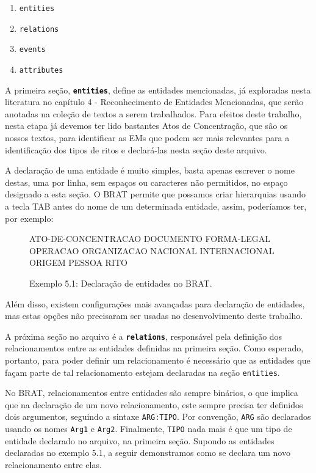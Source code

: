 \documentclass[11pt]{report}
\begin{document}
\begin{enumerate}[label={\textbf{\arabic*.}}]
  \item \texttt{entities}
  \item \texttt{relations}
  \item \texttt{events}
  \item \texttt{attributes}
\end{enumerate}

A primeira seção, \textbf{\texttt{entities}}, define as entidades mencionadas, já exploradas nesta literatura no capítulo 4 - Reconhecimento de Entidades Mencionadas, que serão anotadas na
coleção de textos a serem trabalhados. Para efeitos deste trabalho, nesta etapa já devemos ter lido bastantes Atos de Concentração, que são os nossos textos, para identificar as
EMs que podem ser mais relevantes para a identificação dos tipos de ritos e declará-las nesta seção deste arquivo.

A declaração de uma entidade é muito simples, basta apenas escrever o nome destas, uma por linha, sem espaços ou caracteres não permitidos, no espaço designado a esta seção. O BRAT
permite que possamos criar hierarquias usando a tecla TAB antes do nome de um determinada entidade, assim, poderíamos ter, por exemplo:

\begin{figure}[h!]
\centering
\begin{boxedverbatim}
[entities]

ATO-DE-CONCENTRACAO
DOCUMENTO
FORMA-LEGAL
OPERACAO
ORGANIZACAO
    NACIONAL
    INTERNACIONAL
ORIGEM
PESSOA
RITO
\end{boxedverbatim}
\caption*{Exemplo 5.1: Declaração de entidades no BRAT.}
\end{figure}

Além disso, existem configurações mais avançadas para declaração de entidades, mas estas opções não precisaram ser usadas no desenvolvimento deste trabalho.

A próxima seção no arquivo é a \textbf{\texttt{relations}}, responsável pela definição dos relacionamentos entre as entidades definidas na primeira seção. Como esperado, portanto,
para poder definir um relacionamento é necessário que as entidades que façam parte de tal relacionamento estejam declaradas na seção \texttt{entities}.

No BRAT, relacionamentos entre entidades são sempre binários, o que implica que na declaração de um novo relacionamento, este sempre precisa ter definidos dois argumentos,
seguindo a sintaxe \texttt{ARG:TIPO}. Por convenção, \texttt{ARG} são declarados usando os nomes \texttt{Arg1} e \texttt{Arg2}. Finalmente, \texttt{TIPO} nada mais é que
um tipo de entidade declarado no arquivo, na primeira seção. Supondo as entidades declaradas no exemplo 5.1, a seguir demonstramos como se declara um novo relacionamento entre elas.
\end{document}
